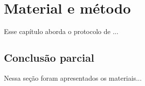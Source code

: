 \clearpage
\section{Material e método}\label{sec:methods}

Esse capítulo aborda o protocolo de ...


\subsection{Conclusão parcial}

Nessa seção foram apresentados os materiais...


